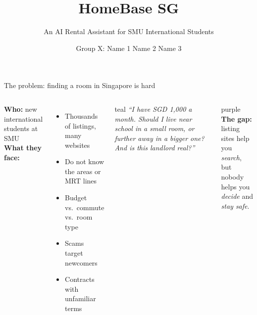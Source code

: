 \documentclass[aspectratio=169,11pt]{beamer}
\title{HomeBase SG}
\subtitle{An AI Rental Assistant for SMU International Students}
\author{Group X: Name 1 \textbullet{} Name 2 \textbullet{} Name 3}
\institute{DS602 \textbullet{} Agent Building Assignment \textbullet{} SMU AI Studio}
\date{}
\begin{document}
\maketitle

\begin{frame}{The problem: finding a room in Singapore is hard}
\begin{columns}[T]
\textbf{Who:} new international students at SMU\\[6pt]
\textbf{What they face:}
\begin{itemize}\small
  \item Thousands of listings, many websites
  \item Do not know the areas or MRT lines
  \item Budget vs.\ commute vs.\ room type
  \item Scams target newcomers
  \item Contracts with unfamiliar terms
\end{itemize}

\begin{card}{teal}
\small
\emph{``I have SGD 1,000 a month. Should I live near school in a small room, or further away in a bigger one? And is this landlord real?''}
\end{card}
\vspace{4pt}
\begin{card}{purple}
\small
\textbf{The gap:} listing sites help you \emph{search},\\
but nobody helps you \emph{decide} and \emph{stay safe}.
\end{card}
\end{columns}
\end{frame}
\end{document}
